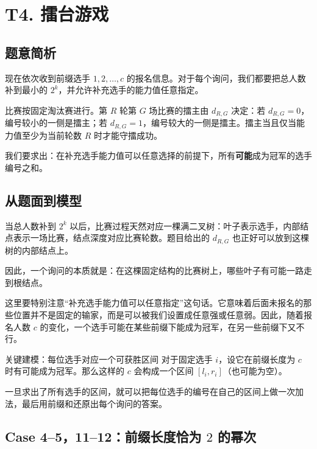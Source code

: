 \documentclass{book}
\begin{document}
\newpage
\section{T4. 擂台游戏} %
    
    
    \subsection{题意简析}

    现在依次收到前缀选手 $1,2,\dots,c$ 的报名信息。对于每个询问，我们都要把总人数补到最小的 $2^k$，并允许补充选手的能力值任意指定。

    比赛按固定淘汰赛进行。第 $R$ 轮第 $G$ 场比赛的擂主由 $d_{R,G}$ 决定：若 $d_{R,G}=0$，编号较小的一侧是擂主；若 $d_{R,G}=1$，编号较大的一侧是擂主。擂主当且仅当能力值至少为当前轮数 $R$ 时才能守擂成功。

    我们要求出：在补充选手能力值可以任意选择的前提下，所有\textbf{可能}成为冠军的选手编号之和。

    
    \subsection{从题面到模型}

    当总人数补到 $2^k$ 以后，比赛过程天然对应一棵满二叉树：叶子表示选手，内部结点表示一场比赛，结点深度对应比赛轮数。题目给出的 $d_{R,G}$ 也正好可以放到这棵树的内部结点上。

    因此，一个询问的本质就是：在这棵固定结构的比赛树上，哪些叶子有可能一路走到根结点。

    这里要特别注意“补充选手能力值可以任意指定”这句话。它意味着后面未报名的那些位置并不是固定的输家，而是可以被我们设置成任意强或任意弱。因此，随着报名人数 $c$ 的变化，一个选手可能在某些前缀下能成为冠军，在另一些前缀下又不行。

    \begin{keybox}{关键建模：每位选手对应一个可获胜区间}
    对于固定选手 $i$，设它在前缀长度为 $c$ 时有可能成为冠军。那么这样的 $c$ 会构成一个区间 $[l_i,r_i]$（也可能为空）。

    一旦求出了所有选手的区间，就可以把每位选手的编号在自己的区间上做一次加法，最后用前缀和还原出每个询问的答案。
    \end{keybox}


\newpage
    \subsection{Case 4--5，11--12：前缀长度恰为 $2$ 的幂次}
\end{document}
